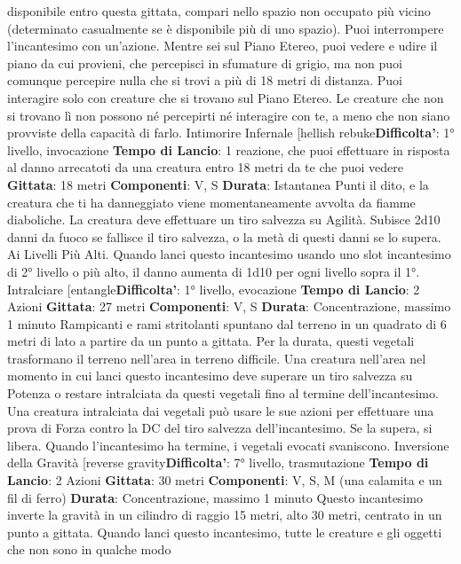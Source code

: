 \begin{multicols}{2}
disponibile entro questa gittata, compari nello spazio
non occupato più vicino (determinato casualmente se è
disponibile più di uno spazio). Puoi interrompere
l’incantesimo con un’azione.
Mentre sei sul Piano Etereo, puoi vedere e udire il
piano da cui provieni, che percepisci in sfumature di
grigio, ma non puoi comunque percepire nulla che si
trovi a più di 18 metri di distanza. Puoi interagire solo
con creature che si trovano sul Piano Etereo. Le
creature che non si trovano lì non possono né percepirti
né interagire con te, a meno che non siano provviste
della capacità di farlo.
Intimorire Infernale
[hellish rebuke\textbf{Difficolta'}:
1° livello, invocazione
\textbf{Tempo di Lancio}: 1 reazione, che puoi effettuare in
risposta al danno arrecatoti da una creatura entro 18
metri da te che puoi vedere
\textbf{Gittata}: 18 metri
\textbf{Componenti}: V, S
\textbf{Durata}: Istantanea
Punti il dito, e la creatura che ti ha danneggiato viene
momentaneamente avvolta da fiamme diaboliche. La
creatura deve effettuare un tiro salvezza su Agilità.
Subisce 2d10 danni da fuoco se fallisce il tiro salvezza,
o la metà di questi danni se lo supera.
Ai Livelli Più Alti. Quando lanci questo incantesimo
usando uno slot incantesimo di 2° livello o più alto, il
danno aumenta di 1d10 per ogni livello sopra il 1°.
Intralciare
[entangle\textbf{Difficolta'}:
1° livello, evocazione
\textbf{Tempo di Lancio}: 2 Azioni
\textbf{Gittata}: 27 metri
\textbf{Componenti}: V, S
\textbf{Durata}: Concentrazione, massimo 1 minuto
Rampicanti e rami stritolanti spuntano dal terreno in un
quadrato di 6 metri di lato a partire da un punto a
gittata. Per la durata, questi vegetali trasformano il
terreno nell’area in terreno difficile.
Una creatura nell’area nel momento in cui lanci questo
incantesimo deve superare un tiro salvezza su Potenza o
restare intralciata da questi vegetali fino al termine
dell’incantesimo. Una creatura intralciata dai vegetali
può usare le sue azioni per effettuare una prova di
Forza contro la DC del tiro salvezza dell’incantesimo.
Se la supera, si libera.
Quando l’incantesimo ha termine, i vegetali evocati
svaniscono.
Inversione della Gravità
[reverse gravity\textbf{Difficolta'}:
7° livello, trasmutazione
\textbf{Tempo di Lancio}: 2 Azioni
\textbf{Gittata}: 30 metri
\textbf{Componenti}: V, S, M (una calamita e un fil di ferro)
\textbf{Durata}: Concentrazione, massimo 1 minuto
Questo incantesimo inverte la gravità in un cilindro di
raggio 15 metri, alto 30 metri, centrato in un punto a
gittata. Quando lanci questo incantesimo, tutte le
creature e gli oggetti che non sono in qualche modo

\end{multicols}
